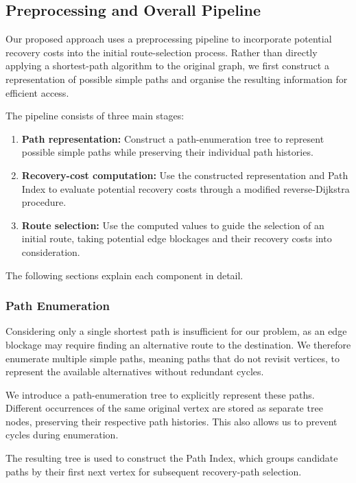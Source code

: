 \documentclass{article}
\begin{document}
\subsection{Preprocessing and Overall Pipeline}

Our proposed approach uses a preprocessing pipeline to incorporate potential recovery costs into the initial route-selection process. Rather than directly applying a shortest-path algorithm to the original graph, we first construct a representation of possible simple paths and organise the resulting information for efficient access.

The pipeline consists of three main stages:

\begin{enumerate}
    \item \textbf{Path representation:} Construct a path-enumeration tree to represent possible simple paths while preserving their individual path histories.
    \item \textbf{Recovery-cost computation:} Use the constructed representation and Path Index to evaluate potential recovery costs through a modified reverse-Dijkstra procedure.
    \item \textbf{Route selection:} Use the computed values to guide the selection of an initial route, taking potential edge blockages and their recovery costs into consideration.
\end{enumerate}

The following sections explain each component in detail.

\subsubsection{Path Enumeration}

Considering only a single shortest path is insufficient for our problem, as an edge blockage may require finding an alternative route to the destination. We therefore enumerate multiple simple paths, meaning paths that do not revisit vertices, to represent the available alternatives without redundant cycles.

We introduce a path-enumeration tree to explicitly represent these paths. Different occurrences of the same original vertex are stored as separate tree nodes, preserving their respective path histories. This also allows us to prevent cycles during enumeration.

The resulting tree is used to construct the Path Index, which groups candidate paths by their first next vertex for subsequent recovery-path selection.
\end{document}
